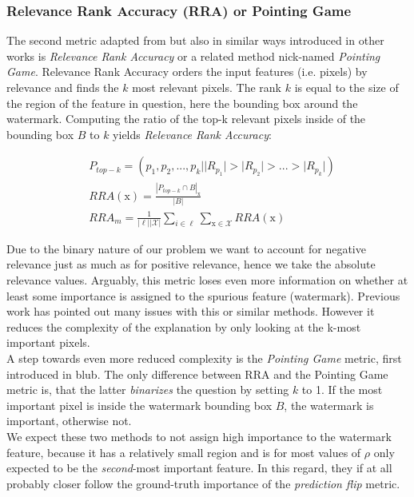 \subsubsection{Relevance Rank Accuracy (RRA) or Pointing Game}
The second metric adapted from \cite{Arras2022} but also in similar ways introduced in other works is \textit{Relevance Rank Accuracy} or a related method nick-named \textit{Pointing Game}.  
Relevance Rank Accuracy orders the input features (i.e. pixels) by relevance and finds the $k$ most relevant pixels. The rank $k$ is equal to the size of the region of the feature in question, here the bounding box around the watermark. Computing the ratio of the top-k relevant pixels inside of the bounding box $B$ to $k$ yields \textit{Relevance Rank Accuracy}:

\begin{align*}
& P_{top-k} = (p_1, p_2,...,p_k | |R_{p_1}| > |R_{p_2}| > ... > |R_{p_k}| ) \\
& RRA(\mathrm{x}) = \frac{|P_{top-k} \cap B|_\mathrm{x}}{|B|} \\
& RRA_m =\frac{1}{|\ell| |\mathcal{X}|} \sum_{i \in \ell} \sum_{\mathrm{x} \in \mathcal{X}} RRA(\mathrm{x})
\end{align*}

Due to the binary nature of our problem we want to account for negative relevance just as much as for positive relevance, hence we take the absolute relevance values.
Arguably, this metric loses even more information on whether at least some importance is assigned to the spurious feature (watermark). Previous work has pointed out many issues with this or similar methods. However it reduces the complexity of the explanation by only looking at the k-most important pixels. \\

A step towards even more reduced complexity is the \textit{Pointing Game} metric, first introduced in blub. The only difference between RRA and the Pointing Game metric is, that the latter \textit{binarizes} the question by setting $k$ to 1. If the most important pixel is inside the watermark bounding box $B$, the watermark is important, otherwise not. \\

We expect these two methods to not assign high importance to the watermark feature, because it has a relatively small region and is for most values of $\rho$ only expected to be the \textit{second}-most important feature. In this regard, they if at all probably closer follow the ground-truth importance of the \textit{prediction flip} metric.

